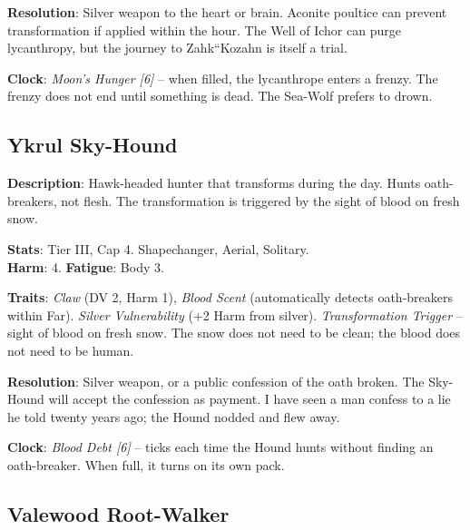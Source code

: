 \noindent\textbf{Resolution}: Silver weapon to the heart or brain. Aconite poultice can prevent transformation if applied within the hour. The Well of Ichor can purge lycanthropy, but the journey to Zahk``Kozahn is itself a trial.

\noindent\textbf{Clock}: \emph{Moon's Hunger [6]} -- when filled, the lycanthrope enters a frenzy. The frenzy does not end until something is dead. The Sea-Wolf prefers to drown.


\subsection*{Ykrul Sky-Hound}

\noindent\textbf{Description}: Hawk-headed hunter that transforms during the day. Hunts oath-breakers, not flesh. The transformation is triggered by the sight of blood on fresh snow.

\noindent\textbf{Stats}: Tier III, Cap 4. Shapechanger, Aerial, Solitary.\\
\textbf{Harm}: 4. \textbf{Fatigue}: Body 3.

\noindent\textbf{Traits}: 
\emph{Claw} (DV 2, Harm 1), \emph{Blood Scent} (automatically detects oath-breakers within Far). \emph{Silver Vulnerability} (+2 Harm from silver). \emph{Transformation Trigger} -- sight of blood on fresh snow. The snow does not need to be clean; the blood does not need to be human.

\noindent\textbf{Resolution}: Silver weapon, or a public confession of the oath broken. The Sky-Hound will accept the confession as payment. I have seen a man confess to a lie he told twenty years ago; the Hound nodded and flew away.

\noindent\textbf{Clock}: \emph{Blood Debt [6]} -- ticks each time the Hound hunts without finding an oath-breaker. When full, it turns on its own pack.


\subsection*{Valewood Root-Walker}

